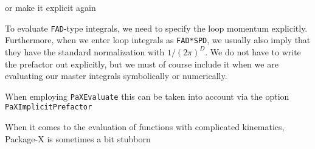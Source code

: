 \documentclass[../FeynHelpersManual.tex]{subfiles}
\begin{document}
or make it explicit again

\begin{Shaded}
\begin{Highlighting}[]
\OperatorTok{[}\OperatorTok{]}
\end{Highlighting}
\end{Shaded}

To evaluate \texttt{FAD}-type integrals, we need to specify the loop
momentum explicitly. Furthermore, when we enter loop integrals as
\texttt{FAD*SPD}, we usually also imply that they have the standard
normalization with \(1/(2\pi)^D\). We do not have to write the prefactor
out explicitly, but we must of course include it when we are evaluating
our master integrals symbolically or numerically.

When employing \texttt{PaXEvaluate} this can be taken into account via
the option \texttt{PaXImplicitPrefactor}

\begin{Shaded}
\begin{Highlighting}[]
\OperatorTok{[}\OperatorTok{[\{}\OperatorTok{,} \OperatorTok{\}],} \OperatorTok{,}\OtherTok{{-}\textgreater{}} \SpecialCharTok{/}\NormalTok{(} \NormalTok{)}\SpecialCharTok{\^{}}\NormalTok{(} \SpecialCharTok{{-}} \OperatorTok{]}
\end{Highlighting}
\end{Shaded}

When it comes to the evaluation of functions with complicated
kinematics, Package-X is sometimes a bit stubborn

\begin{Shaded}
\begin{Highlighting}[]
\OperatorTok{[}\OperatorTok{[}\OperatorTok{,} \OperatorTok{,} \OperatorTok{,} \OperatorTok{\{}\OperatorTok{[}\OperatorTok{,} \OperatorTok{],}\OperatorTok{[}\OperatorTok{,} \OperatorTok{],} \SpecialCharTok{\^{}}\OperatorTok{\},} \OperatorTok{\{}\SpecialCharTok{\^{}}\OperatorTok{,} \SpecialCharTok{\^{}}\OperatorTok{,} \SpecialCharTok{\^{}}\OperatorTok{\}]]}
\end{Highlighting}
\end{Shaded}
\end{document}

